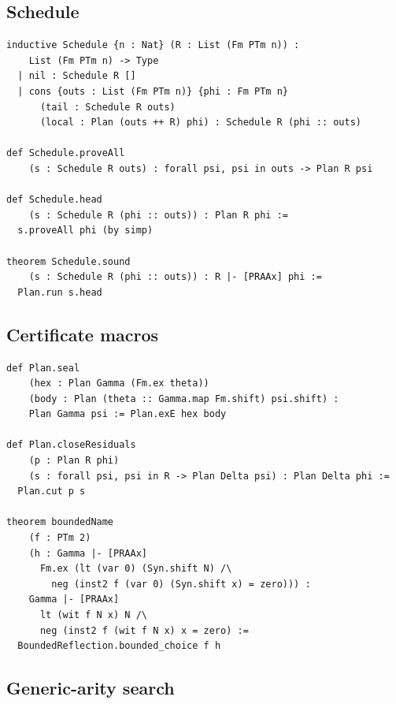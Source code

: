 \subsection{Schedule}

\begin{lstlisting}[language=Lean]
inductive Schedule {n : Nat} (R : List (Fm PTm n)) :
    List (Fm PTm n) -> Type
  | nil : Schedule R []
  | cons {outs : List (Fm PTm n)} {phi : Fm PTm n}
      (tail : Schedule R outs)
      (local : Plan (outs ++ R) phi) : Schedule R (phi :: outs)

def Schedule.proveAll
    (s : Schedule R outs) : forall psi, psi in outs -> Plan R psi

def Schedule.head
    (s : Schedule R (phi :: outs)) : Plan R phi :=
  s.proveAll phi (by simp)

theorem Schedule.sound
    (s : Schedule R (phi :: outs)) : R |- [PRAAx] phi :=
  Plan.run s.head
\end{lstlisting}

\subsection{Certificate macros}

\begin{lstlisting}[language=Lean]
def Plan.seal
    (hex : Plan Gamma (Fm.ex theta))
    (body : Plan (theta :: Gamma.map Fm.shift) psi.shift) :
    Plan Gamma psi := Plan.exE hex body

def Plan.closeResiduals
    (p : Plan R phi)
    (s : forall psi, psi in R -> Plan Delta psi) : Plan Delta phi :=
  Plan.cut p s

theorem boundedName
    (f : PTm 2)
    (h : Gamma |- [PRAAx]
      Fm.ex (lt (var 0) (Syn.shift N) /\
        neg (inst2 f (var 0) (Syn.shift x) = zero))) :
    Gamma |- [PRAAx]
      lt (wit f N x) N /\
      neg (inst2 f (wit f N x) x = zero) :=
  BoundedReflection.bounded_choice f h
\end{lstlisting}

\subsection{Generic-arity search}


